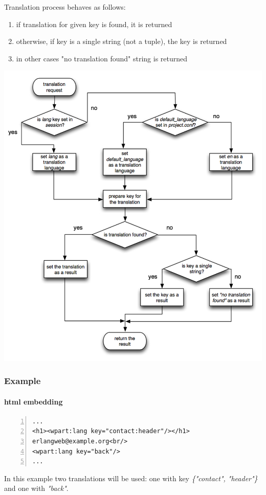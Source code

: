 Translation process behaves as follows:
\begin{enumerate}
\item if translation for given key is found, it is returned
\item otherwise, if key is a single string (not a tuple), the key is returned
\item in other cases "no translation found" string is returned
\end{enumerate}

\includegraphics[width=\textwidth]{images/e_lang.jpg}   

\clearpage
\subsubsection{Example}
\paragraph{html embedding} 
\begin{Verbatim}[numbers=left]
...
<h1><wpart:lang key="contact:header"/></h1>
erlangweb@example.org<br/>
<wpart:lang key="back"/>
...
\end{Verbatim}
In this example two translations will be used: one with key {\it \{"contact", "header"\}} and one with {\it "back"}.

